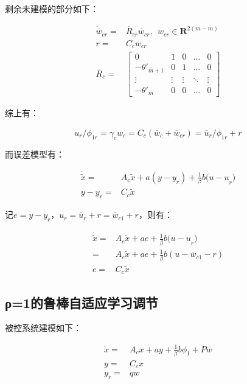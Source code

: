 \documentclass[
  12pt,
  a4paper
]{article}
\begin{document}
剩余未建模的部分如下：

\[\begin{aligned}
{\dot{\overline{w}}}_{cr} = & {\overline{R}}_{cr}{\overline{w}}_{cr},\ \ w_{cr} \in \mathbf{R}^{2(m - \overline{m})} \\
r = & C_{c}{\overline{w}}_{cr} \\
{\overline{R}}_{c} = & \begin{bmatrix}
0 & 1 & 0 & \ldots & 0 \\
 - {\theta'}_{\overline{m} + 1} & 0 & 1 & \ldots & 0 \\
 \vdots & \vdots & \vdots & \ddots & \vdots \\
 - {\theta'}_{\overline{m}} & 0 & 0 & \ldots & 0
\end{bmatrix}
\end{aligned}\]

综上有：

\[u_{r}/\phi_{1r} = \gamma_{c}w_{c} = C_{c}({\overline{w}}_{c} + {\overline{w}}_{cr}) = {\overline{u}}_{r}/{\overline{\phi}}_{1r} + r\]

而误差模型有：

\[\begin{aligned}
\dot{\widetilde{x}} = & A_{c}\widetilde{x} + a({y - y}_{r}) + \frac{1}{\beta}b{(u - u}_{r}) \\
y - y_{r} = & C_{c}\widetilde{x}
\end{aligned}\]

记\(e = y - y_{r}\)，\(u_{r} = {\overline{u}}_{r} + r = {\overline{w}}_{c1} + r\)，则有：

\[\begin{aligned}
\dot{\widetilde{x}} = & A_{c}\widetilde{x} + ae + \frac{1}{\beta}b{(u - u}_{r}) \\
 = & A_{c}\widetilde{x} + ae + \frac{1}{\beta}b(u - {\overline{w}}_{c1} - r) \\
e = & C_{c}\widetilde{x}
\end{aligned}\]

\subsection{ρ=1的鲁棒自适应学习调节}\label{ux3c11ux7684ux9c81ux68d2ux81eaux9002ux5e94ux5b66ux4e60ux8c03ux8282}

被控系统建模如下：

\[\begin{aligned}
\dot{x} = & A_{c}x + ay + \frac{1}{\beta}b\phi_{1} + Pw \\
y = & C_{c}x \\
y_{r} = & qw
\end{aligned}\]
\end{document}
